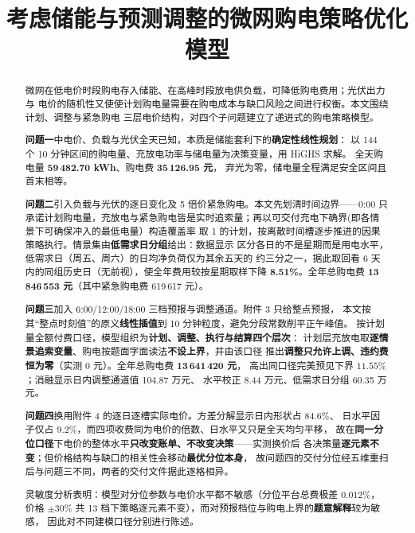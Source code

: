 \documentclass[withoutpreface]{cumcmthesis}
\title{考虑储能与预测调整的微网购电策略优化模型}
\renewcommand{\emph}[1]{\textbf{#1}}
\begin{document}
\maketitle

\begin{abstract}
微网在低电价时段购电存入储能、在高峰时段放电供负载，可降低购电费用；光伏出力与
电价的随机性又使使计划购电量需要在购电成本与缺口风险之间进行权衡。本文围绕计划、调整与紧急购电
三层电价结构，对四个子问题建立了递进式的购电策略模型。

\textbf{问题一}中电价、负载与光伏全天已知，本质是储能套利下的\textbf{确定性线性规划}：
以 144 个 10 分钟区间的购电量、充放电功率与储电量为决策变量，用 HiGHS 求解。
全天购电量 \textbf{59\,482.70 kWh}、购电费 \textbf{35\,126.95 元}，
弃光为零，储电量全程满足安全区间且首末相等。

\textbf{问题二}引入负载与光伏的逐日变化及 5 倍价紧急购电。本文先划清时间边界——0:00
只承诺计划购电量，充放电与紧急购电皆是实时追索量；再以可交付充电下确界(即各情景下可确保冲入的最低电量）构造覆盖率
取 1 的计划，按离散时间槽逐步推进的因果策略执行。情景集由\textbf{低需求日分组}给出：数据显示
区分各日的不是星期而是用电水平，低需求日（周五、周六）的日均净负荷仅为其余五天的
约三分之一，据此取回看 6 天内的同组历史日（无前视），使全年费用较按星期取样下降
\textbf{8.51\%}。全年总购电费 \textbf{13\,846\,553 元}（其中紧急购电费 619\,617 元）。

\textbf{问题三}加入 6:00/12:00/18:00 三档预报与调整通道。附件 3 只给整点预报，
本文按其“整点时刻值”的原义\textbf{线性插值}到 10 分钟粒度，避免分段常数削平正午峰值。
按计划量全额付费口径，模型组织为\textbf{计划、调整、执行与结算四个层次}：
计划层充放电取\textbf{逐情景追索变量}、购电按题面字面读法\textbf{不设上界}，并由该口径
推出\textbf{调整只允许上调、违约费恒为零}（实测 0 元）。全年总购电费 \textbf{13\,641\,420 元}，
高出同口径完美预见下界 \textbf{$11.55\%$}；消融显示日内调整通道值 104.87 万元、
水平校正 8.44 万元、低需求日分组 60.35 万元。

\textbf{问题四}换用附件 4 的逐日逐槽实际电价。方差分解显示日内形状占 \textbf{$84.6\%$}、
日水平因子仅占 \textbf{$9.2\%$}，而四项收费同为电价的倍数、日水平又只是全天均匀平移，
故在\emph{同一分位口径}下电价的整体水平\textbf{只改变账单、不改变决策}——实测换价后
各决策量\textbf{逐元素不变}；但价格结构与缺口的相关性会移动\emph{最优分位本身}，
故问题四的交付分位经五维重扫后与问题三不同，两者的交付文件据此逐格相异。

灵敏度分析表明：模型对分位参数与电价水平都不敏感（分位平台总费极差 $0.012\%$，
价格 $\pm30\%$ 共 13 档下策略逐元素不变），而对预报档位与购电上界的\emph{题意解释}较为敏感，
因此对不同建模口径分别进行陈述。


\end{abstract}
\end{document}
